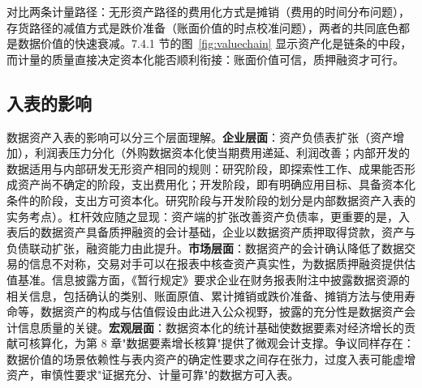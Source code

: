 对比两条计量路径：无形资产路径的费用化方式是摊销（费用的时间分布问题），存货路径的减值方式是跌价准备（账面价值的时点校准问题），两者的共同底色都是数据价值的快速衰减。7.4.1 节的图~\ref{fig:valuechain} 显示资产化是链条的中段，而计量的质量直接决定资本化能否顺利衔接：账面价值可信，质押融资才可行。

\subsection{入表的影响}

数据资产入表的影响可以分三个层面理解。\textbf{企业层面}：资产负债表扩张（资产增加），利润表压力分化（外购数据资本化使当期费用递延、利润改善；内部开发的数据适用与内部研发无形资产相同的规则：研究阶段，即探索性工作、成果能否形成资产尚不确定的阶段，支出费用化；开发阶段，即有明确应用目标、具备资本化条件的阶段，支出方可资本化。研究阶段与开发阶段的划分是内部数据资产入表的实务考点）。杠杆效应随之显现：资产端的扩张改善资产负债率，更重要的是，入表后的数据资产具备质押融资的会计基础，企业以数据资产质押取得贷款，资产与负债联动扩张，融资能力由此提升。\textbf{市场层面}：数据资产的会计确认降低了数据交易的信息不对称，交易对手可以在报表中核查资产真实性，为数据质押融资提供估值基准。信息披露方面，《暂行规定》要求企业在财务报表附注中披露数据资源的相关信息，包括确认的类别、账面原值、累计摊销或跌价准备、摊销方法与使用寿命等，数据资产的构成与估值假设由此进入公众视野，披露的充分性是数据资产会计信息质量的关键。\textbf{宏观层面}：数据资本化的统计基础使数据要素对经济增长的贡献可核算化，为第 8 章"数据要素增长核算"提供了微观会计支撑。争议同样存在：数据价值的场景依赖性与表内资产的确定性要求之间存在张力，过度入表可能虚增资产，审慎性要求"证据充分、计量可靠"的数据方可入表。

